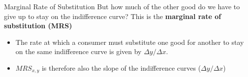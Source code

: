 \documentclass{beamer}
\begin{document}
\begin{frame}{Marginal Rate of Substitution}
  But how much of the other good do we have to give up to stay on the indifference curve? This is the \textbf{marginal rate of substitution (MRS)}

  \begin{itemize}
    \item The rate at which a consumer must substitute one good for another to stay on the same indifference curve is given by $\Delta y / \Delta x$.

    \item $MRS_{x,y}$ is therefore also the slope of the indifference curves ($\Delta y / \Delta x$)
  \end{itemize}

\end{frame}
\end{document}
